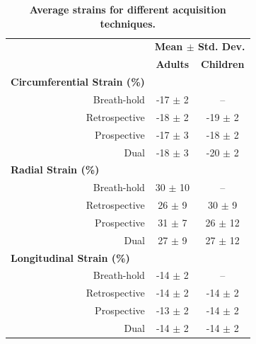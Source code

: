 	\begin{table}
		\centering
		\caption[Average strains for different acquisition techniques]{\textbf{Average strains for different acquisition techniques.}}
		\label{table:navigator_strains}
		\begin{tabular}{c  c  c}
			\toprule
			\multicolumn{1}{c}{}       			 & \multicolumn{2}{c}{\textbf{Mean $\pm$ Std. Dev.}} \\ 
			\multicolumn{1}{c}{}				 & \multicolumn{1}{c}{\textbf{Adults}} 			& \multicolumn{1}{c}{\textbf{Children}} \\ \midrule
			\multicolumn{1}{l}{\textbf{Circumferential Strain (\%)}}                       		& \multicolumn{2}{c}{} \\
			\multicolumn{1}{r}{Breath-hold}      & \multicolumn{1}{c}{-17 $\pm$ 2}              & \multicolumn{1}{c}{--}          			\\
			\multicolumn{1}{r}{Retrospective}    & \multicolumn{1}{c}{-18 $\pm$ 2}              & \multicolumn{1}{c}{-19 $\pm$ 2}           \\
			\multicolumn{1}{r}{Prospective}      & \multicolumn{1}{c}{-17 $\pm$ 3}              & \multicolumn{1}{c}{-18 $\pm$ 2}           \\
			\multicolumn{1}{r}{Dual}    		 & \multicolumn{1}{c}{-18 $\pm$ 3}              & \multicolumn{1}{c}{-20 $\pm$ 2}           \\
			\multicolumn{1}{l}{\textbf{Radial Strain (\%)}}                       				& \multicolumn{2}{c}{} \\
			\multicolumn{1}{r}{Breath-hold}      & \multicolumn{1}{c}{30 $\pm$ 10}              & \multicolumn{1}{c}{--}          			\\
			\multicolumn{1}{r}{Retrospective}    & \multicolumn{1}{c}{26 $\pm$ 9}               & \multicolumn{1}{c}{30 $\pm$ 9}           \\
			\multicolumn{1}{r}{Prospective}      & \multicolumn{1}{c}{31 $\pm$ 7}               & \multicolumn{1}{c}{26 $\pm$ 12}           \\
			\multicolumn{1}{r}{Dual}		     & \multicolumn{1}{c}{27 $\pm$ 9}               & \multicolumn{1}{c}{27 $\pm$ 12}           \\
			\multicolumn{1}{l}{\textbf{Longitudinal Strain (\%)}}                       		& \multicolumn{2}{c}{} \\
			\multicolumn{1}{r}{Breath-hold}      & \multicolumn{1}{c}{-14 $\pm$ 2}              & \multicolumn{1}{c}{--}          			\\
			\multicolumn{1}{r}{Retrospective}    & \multicolumn{1}{c}{-14 $\pm$ 2}              & \multicolumn{1}{c}{-14 $\pm$ 2}           \\
			\multicolumn{1}{r}{Prospective}      & \multicolumn{1}{c}{-13 $\pm$ 2}              & \multicolumn{1}{c}{-14 $\pm$ 2}           \\
			\multicolumn{1}{r}{Dual}		     & \multicolumn{1}{c}{-14 $\pm$ 2}              & \multicolumn{1}{c}{-14 $\pm$ 2}           \\
			\bottomrule                                                 
		\end{tabular}
	\end{table}
	
